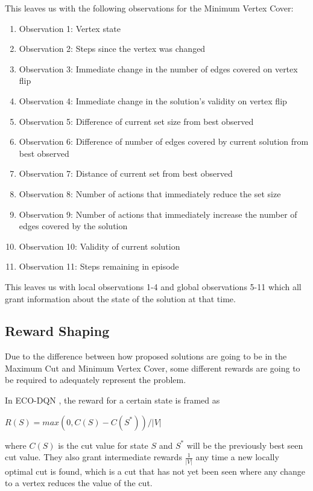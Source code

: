 \documentclass{article}
\begin{document}
This leaves us with the following observations for the Minimum Vertex Cover:

\begin{enumerate}
    \item Observation 1: Vertex state
    \item Observation 2: Steps since the vertex was changed 
    \item Observation 3: Immediate change in the number of edges covered on vertex flip 
    \item Observation 4: Immediate change in the solution's validity on vertex flip 
    \item Observation 5: Difference of current set size from best observed 
    \item Observation 6: Difference of number of edges covered by current solution from best observed 
    \item Observation 7: Distance of current set from best observed 
    \item Observation 8: Number of actions that immediately reduce the set size
    \item Observation 9: Number of actions that immediately increase the number of edges covered by the solution 
    \item Observation 10: Validity of current solution 
    \item Observation 11: Steps remaining in episode 
\end{enumerate}

This leaves us with local observations 1-4 and global observations 5-11 which all grant information about the state of the solution at that time. 

\subsection{Reward Shaping}

Due to the difference between how proposed solutions are going to be in the Maximum Cut and Minimum Vertex Cover, some different rewards are going to be required to adequately represent the problem.

In ECO-DQN \cite{eco-dqn}, the reward for a certain state is framed as

$R(S) = max(0, C(S) - C(S^*)) / |V|$

where $C(S)$ is the cut value for state $S$ and $S^*$ will be the previously best seen cut value. They also grant intermediate rewards $\frac{1}{|V|}$ any time a new locally optimal cut is found, which is a cut that has not yet been seen where any change to a vertex reduces the value of the cut.
\end{document}
